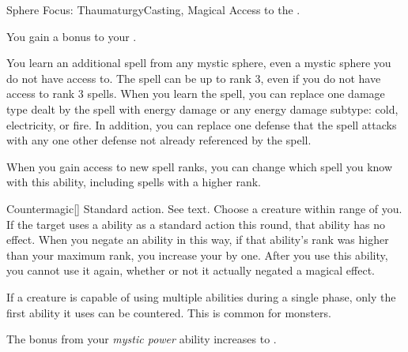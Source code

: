     \begin{magicalfeat}{Sphere Focus: Thaumaturgy}{Casting, Magical}
        \featpre Access to the  .

         You gain a  bonus to your .

         You learn an additional spell from any mystic sphere, even a mystic sphere you do not have access to.
        The spell can be up to rank 3, even if you do not have access to rank 3 spells.
        When you learn the spell, you can replace one damage type dealt by the spell with energy damage or any energy damage subtype: cold, electricity, or fire.
        In addition, you can replace one defense that the spell attacks with any one other defense not already referenced by the spell.

        When you gain access to new spell ranks, you can change which spell you know with this ability, including spells with a higher rank.

        \begin{magicalactiveability}{Countermagic}[]
            \abilityusagetime Standard action.
            \abilitycost See text.
            \rankline
            Choose a creature within \rngmed range of you.
            If the target uses a \magical ability as a standard action this round, that ability has no effect.
            When you negate an ability in this way, if that ability's rank was higher than your maximum rank, you increase your  by one.
            After you use this ability, you  cannot use it again, whether or not it actually negated a magical effect.

            If a creature is capable of using multiple abilities during a single phase, only the first ability it uses can be countered.
            This is common for  monsters.
        \end{magicalactiveability}

         The bonus from your \textit{mystic power} ability increases to .
    \end{magicalfeat}

